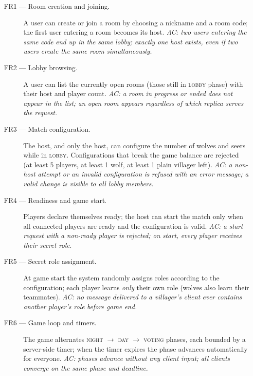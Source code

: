 \documentclass{scrartcl}
\begin{document}
\begin{description}
      \item[FR1 --- Room creation and joining.] A user can create or join a room by
            choosing a nickname and a room code; the first user entering a room becomes
            its host. \emph{AC: two users entering the same code end up in the same
                  lobby; exactly one host exists, even if two users create the same room
                  simultaneously.}

      \item[FR2 --- Lobby browsing.] A user can list the currently open rooms
            (those still in \textsc{lobby} phase) with their host and player count.
            \emph{AC: a room in progress or ended does not appear in the list; an open
                  room appears regardless of which replica serves the request.}

      \item[FR3 --- Match configuration.] The host, and only the host, can
            configure the number of wolves and seers while in \textsc{lobby}.
            Configurations that break the game balance are rejected (at least 5 players,
            at least 1 wolf, at least 1 plain villager left). \emph{AC: a non-host attempt
                  or an invalid configuration is refused with an error message; a valid change
                  is visible to all lobby members.}

      \item[FR4 --- Readiness and game start.] Players declare themselves ready; the
            host can start the match only when all connected players are ready and the
            configuration is valid. \emph{AC: a start request with a non-ready player is
                  rejected; on start, every player receives their secret role.}

      \item[FR5 --- Secret role assignment.] At game start the system randomly
            assigns roles according to the configuration; each player learns \emph{only}
            their own role (wolves also learn their teammates). \emph{AC: no message
                  delivered to a villager's client ever contains another player's role before
                  game end.}

      \item[FR6 --- Game loop and timers.] The game alternates
            \textsc{night} $\to$ \textsc{day} $\to$ \textsc{voting} phases, each bounded
            by a server-side timer; when the timer expires the phase advances
            automatically for everyone. \emph{AC: phases advance without any client input;
                  all clients converge on the same phase and deadline.}


\end{description}
\end{document}
